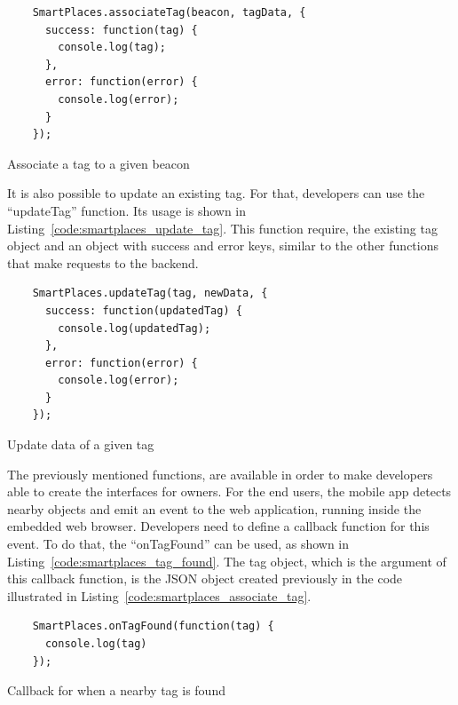 \begin{listing}[H]
  \begin{verbatim}
    SmartPlaces.associateTag(beacon, tagData, {
      success: function(tag) {
        console.log(tag);
      },
      error: function(error) {
        console.log(error);
      }
    });
  \end{verbatim}
  \caption{Associate a tag to a given beacon}
  \label{code:smartplaces_associate_tag}
\end{listing}

It is also possible to update an existing tag. For that, developers can use the ``updateTag'' function. Its usage is shown in Listing~\ref{code:smartplaces_update_tag}. This function require, the existing tag object and an object with success and error keys, similar to the other functions that make requests to the backend.

\begin{listing}[H]
  \begin{verbatim}
    SmartPlaces.updateTag(tag, newData, {
      success: function(updatedTag) {
        console.log(updatedTag);
      },
      error: function(error) {
        console.log(error);
      }
    });
  \end{verbatim}
  \caption{Update data of a given tag}
  \label{code:smartplaces_update_tag}
\end{listing}

The previously mentioned functions, are available in order to make developers able to create the interfaces for owners.
For the end users, the mobile app detects nearby objects and emit an event to the web application, running inside the embedded web browser.
Developers need to define a callback function for this event.
To do that, the ``onTagFound'' can be used, as shown in Listing~\ref{code:smartplaces_tag_found}.
The tag object, which is the argument of this callback function, is the \gls{JSON} object created previously in the code illustrated in Listing~\ref{code:smartplaces_associate_tag}.

\begin{listing}[H]
  \begin{verbatim}
    SmartPlaces.onTagFound(function(tag) {
      console.log(tag)
    });
  \end{verbatim}
  \caption{Callback for when a nearby tag is found}
  \label{code:smartplaces_tag_found}
\end{listing}

